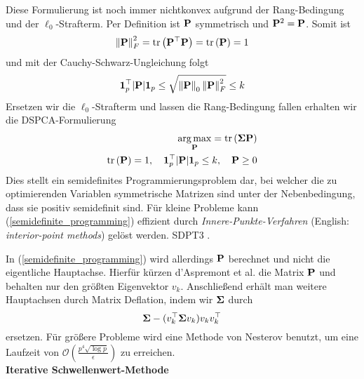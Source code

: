 Diese Formulierung ist noch immer nichtkonvex aufgrund der Rang-Bedingung  und der $\ell_0$-Strafterm. 
Per Definition ist $\mathbf{P}$ symmetrisch und $\mathbf{P}^2 = \mathbf{P}$. Somit ist
$$\left\lVert \mathbf{P} \right\rVert_{F}^{2} = \text{tr} \left( \mathbf{P}^{\top}\mathbf{P} \right) = \text{tr} \left( \mathbf{P} \right) = 1$$
und mit der Cauchy-Schwarz-Ungleichung folgt
$$\mathbf{1}_p^{\top} |\mathbf{P}| \mathbf{1}_p \leq \sqrt{\left\lVert \mathbf{P} \right\rVert_0 \left\lVert \mathbf{P} \right\rVert_F^2} \leq k$$
Ersetzen wir die $\ell_0$-Strafterm und lassen die Rang-Bedingung fallen erhalten wir die DSPCA-Formulierung
\begin{align}
\label{semidefinite_programming}
\begin{split}
\operatorname*{arg\,max}_{\mathbf{P}} = \text{tr} \left( \mathbf{\Sigma}\mathbf{P} \right)\\
\text{tr} \left( \mathbf{P} \right) = 1, \quad \mathbf{1}_p^{\top} |\mathbf{P}| \mathbf{1}_p \leq k, \quad \mathbf{P} \geq 0
\end{split}
\end{align}
Dies stellt ein semidefinites Programmierungsproblem dar, bei welcher die zu optimierenden Variablen symmetrische Matrizen sind unter der Nebenbedingung, dass sie positiv semidefinit sind. Für kleine Probleme kann (\ref{semidefinite_programming}) effizient durch \textit{Innere-Punkte-Verfahren} (English: \textit{interior-point methods}) gelöst werden. SDPT3 \cite{toh}.

In (\ref{semidefinite_programming}) wird allerdings $\mathbf{P}$ berechnet und nicht die eigentliche Hauptachse. Hierfür kürzen d'Aspremont et al. die Matrix $\mathbf{P}$ und behalten nur den größten Eigenvektor $v_k$. Anschließend erhält man weitere Hauptachsen durch Matrix Deflation, indem wir $\mathbf{\Sigma}$ durch
$$\mathbf{\Sigma} - (v_k^{\top}\mathbf{\Sigma} v_k) v_kv_k^{\top}$$ 
ersetzen. Für größere Probleme wird eine Methode von Nesterov benutzt, um eine Laufzeit von $\mathcal{O}(\frac{p^4\sqrt{\log{p}}}{\epsilon})$ zu erreichen.\\

\textbf{Iterative Schwellenwert-Methode}

